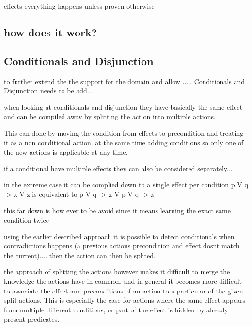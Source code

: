 effects
everything happens unless proven otherwise

\subsection{how does it work?}

\subsection{Conditionals and Disjunction}	

	to further extend the the support for the domain and allow ..... Conditionals and Disjunction needs to be add...


	when looking  at conditionals and disjunction they have basically the same effect and can be compiled away by splitting the action into multiple actions. 
	
	This can done by moving the condition from effects to precondition and treating it as a non conditional action. at the same time adding conditions so only one of the new actions is applicable at any time.
	
	if a conditional have multiple effects they can also be considered separately...
	
	in the extreme case it can be complied down to a single effect per condition 
	p V q -> x V z
	is equivalent to 
	p V q -> x
	V
	p V q -> z
	
	this far down is how ever to be avoid since it means learning the exact same condition twice
	
	
	
	using the earlier described approach it is possible to detect conditionals when contradictions happens (a previous actions precondition and effect dosnt match the current).... then the action can then be splited. %
	
	

	
	the approach of splitting the actions however makes it difficult to merge the knowledge the actions have in common, and in general it becomes more difficult to associate the effect and preconditions of an action to a particular of the given split actions. This is especially the case for actions where the same effect appears from multiple different conditions, or part of the effect is hidden by already present predicates.
	
	
